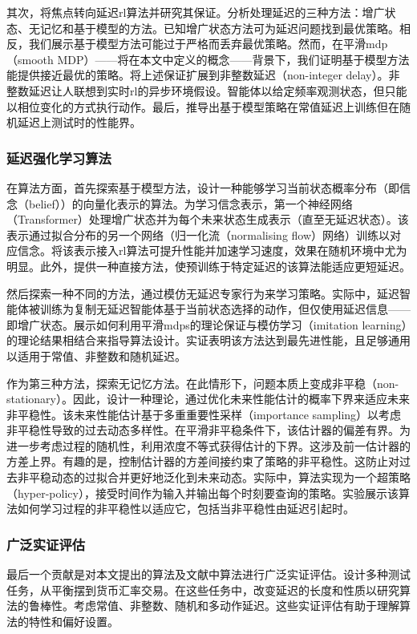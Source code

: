 其次，将焦点转向延迟\gls{rl}算法并研究其保证。分析处理延迟的三种方法：增广状态、无记忆和基于模型的方法。已知增广状态方法可为延迟问题找到最优策略。相反，我们展示基于模型方法可能过于严格而丢弃最优策略。然而，在平滑\gls{mdp}（smooth MDP）——将在本文中定义的概念——背景下，我们证明基于模型方法能提供接近最优的策略。将上述保证扩展到非整数延迟（non-integer delay）。非整数延迟让人联想到实时\gls{rl}的异步环境假设。智能体以给定频率观测状态，但只能以相位变化的方式执行动作。最后，推导出基于模型策略在常值延迟上训练但在随机延迟上测试时的性能界。

\subsubsection{延迟强化学习算法}

在算法方面，首先探索基于模型方法，设计一种能够学习当前状态概率分布（即信念（belief））的向量化表示的算法。为学习信念表示，第一个神经网络（Transformer）处理增广状态并为每个未来状态生成表示（直至无延迟状态）。该表示通过拟合分布的另一个网络（归一化流（normalising flow）网络）训练以对应信念。将该表示接入\gls{rl}算法可提升性能并加速学习速度，效果在随机环境中尤为明显。此外，提供一种直接方法，使预训练于特定延迟的该算法能适应更短延迟。

然后探索一种不同的方法，通过模仿无延迟专家行为来学习策略。实际中，延迟智能体被训练为复制无延迟智能体基于当前状态选择的动作，但仅使用延迟信息——即增广状态。展示如何利用平滑\glspl{mdp}的理论保证与模仿学习（imitation learning）的理论结果相结合来指导算法设计。实证表明该方法达到最先进性能，且足够通用以适用于常值、非整数和随机延迟。

作为第三种方法，探索无记忆方法。在此情形下，问题本质上变成非平稳（non-stationary）。因此，设计一种理论，通过优化未来性能估计的概率下界来适应未来非平稳性。该未来性能估计基于多重重要性采样（importance sampling）以考虑非平稳性导致的过去动态多样性。在平滑非平稳条件下，该估计器的偏差有界。为进一步考虑过程的随机性，利用浓度不等式获得估计的下界。这涉及前一估计器的方差上界。有趣的是，控制估计器的方差间接约束了策略的非平稳性。这防止对过去非平稳动态的过拟合并更好地泛化到未来动态。实际中，算法实现为一个超策略（hyper-policy），接受时间作为输入并输出每个时刻要查询的策略。实验展示该算法如何学习过程的非平稳性以适应它，包括当非平稳性由延迟引起时。

\subsubsection{广泛实证评估}

最后一个贡献是对本文提出的算法及文献中算法进行广泛实证评估。设计多种测试任务，从平衡摆到货币汇率交易。在这些任务中，改变延迟的长度和性质以研究算法的鲁棒性。考虑常值、非整数、随机和多动作延迟。这些实证评估有助于理解算法的特性和偏好设置。


